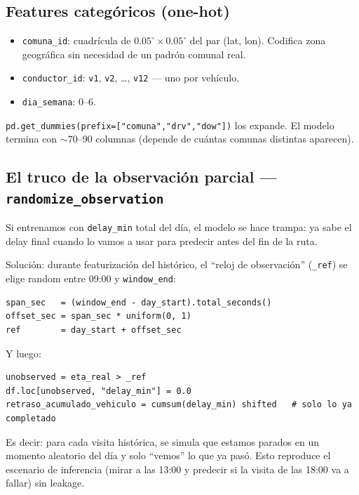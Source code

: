 \documentclass[11pt,a4paper]{article}
\begin{document}
\subsection{Features categóricos (one-hot)}

\begin{itemize}
  \item \texttt{comuna\_id}: cuadrícula de $0.05^{\circ} \times 0.05^{\circ}$ del par (lat, lon). Codifica zona geográfica sin necesidad de un padrón comunal real.
  \item \texttt{conductor\_id}: \texttt{v1}, \texttt{v2}, \dots, \texttt{v12} --- uno por vehículo.
  \item \texttt{dia\_semana}: 0--6.
\end{itemize}

\texttt{pd.get\_dummies(prefix=["comuna","drv","dow"])} los expande. El modelo termina con $\sim$70--90 columnas (depende de cuántas comunas distintas aparecen).

\subsection{El truco de la observación parcial --- \texttt{randomize\_observation}}

Si entrenamos con \texttt{delay\_min} total del día, el modelo se hace trampa: ya sabe el delay final cuando lo vamos a usar para predecir antes del fin de la ruta.

Solución: durante featurización del histórico, el ``reloj de observación'' (\texttt{\_ref}) se elige random entre 09:00 y \texttt{window\_end}:

\begin{lstlisting}[language=pyplus]
span_sec   = (window_end - day_start).total_seconds()
offset_sec = span_sec * uniform(0, 1)
ref        = day_start + offset_sec
\end{lstlisting}

Y luego:

\begin{lstlisting}[language=pyplus]
unobserved = eta_real > _ref
df.loc[unobserved, "delay_min"] = 0.0
retraso_acumulado_vehiculo = cumsum(delay_min) shifted   # solo lo ya completado
\end{lstlisting}

Es decir: para cada visita histórica, se simula que estamos parados en un momento aleatorio del día y solo ``vemos'' lo que ya pasó. Esto reproduce el escenario de inferencia (mirar a las 13:00 y predecir si la visita de las 18:00 va a fallar) sin leakage.
\end{document}
